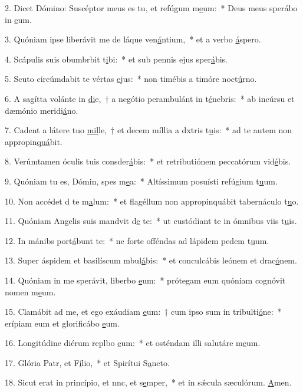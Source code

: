 2. Dicet Dómino: Suscéptor meus es tu, et refúgum m\uline{e}um:~* Deus meus sperábo in \uline{e}um.\par 
3. Quóniam ipse liberávit me de láque ven\uline{á}ntium,~* et a verbo \uline{á}spero.\par 
4. Scápulis suis obumbrbit t\uline{i}bi:~* et sub pennis ejus sper\uline{á}bis.\par 
5. Scuto circúmdabit te vértas \uline{e}jus:~* non timébis a timóre noct\uline{ú}rno.\par 
6. A sagítta volánte in \uline{di}e,~† a negótio perambulánt in t\uline{é}nebris:~* ab incúrsu et dæmónio meridi\uline{á}no.\par 
7. Cadent a látere tuo \uline{mil}le,~† et decem míllia a dxtris t\uline{u}is:~* ad te autem non appropin\uline{quá}bit.\par 
8. Verúmtamen óculis tuis consder\uline{á}bis:~* et retributiónem peccatórum vid\uline{é}bis.\par 
9. Quóniam tu es, Dómin, spes m\uline{e}a:~* Altíssimum posuísti refúgium t\uline{u}um.\par 
10. Non accédet d te m\uline{a}lum:~* et flagéllum non appropinquábit tabernáculo t\uline{u}o.\par 
11. Quóniam Angelis suis mandvit d\uline{e} te:~* ut custódiant te in ómnibus viis t\uline{u}is.\par 
12. In mánibs port\uline{á}bunt te:~* ne forte offéndas ad lápidem pedem t\uline{u}um.\par 
13. Super áspidem et basilíscum mbul\uline{á}bis:~* et conculcábis leónem et drac\uline{ó}nem.\par 
14. Quóniam in me sperávit, liberbo \uline{e}um:~* prótegam eum quóniam cognóvit nomen m\uline{e}um.\par 
15. Clamábit ad me, et ego exáudiam \uline{e}um:~† cum ipso sum in tribulti\uline{ó}ne:~* erípiam eum et glorificábo \uline{e}um.\par 
16. Longitúdine diérum replbo \uline{e}um:~* et osténdam illi salutáre m\uline{e}um.\par 
17. Glória Patr, et F\uline{í}lio,~* et Spirítui S\uline{a}ncto.\par 
18. Sicut erat in princípio, et nnc, et s\uline{e}mper,~* et in sǽcula sæculórum. \uline{A}men.\par 
